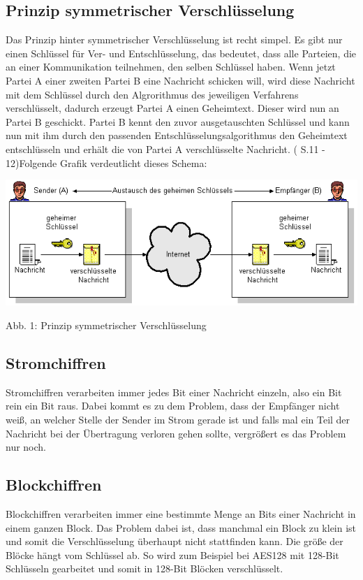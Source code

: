 \documentclass[a4paper,12pt,titlepage]{article}
\begin{document}
\subsection{Prinzip symmetrischer Verschlüsselung}
Das Prinzip hinter symmetrischer Verschlüsselung ist recht simpel. Es gibt nur einen Schlüssel für Ver- und Entschlüsselung, das bedeutet, dass alle Parteien, die an einer Kommunikation teilnehmen, den selben Schlüssel haben. Wenn jetzt Partei A einer zweiten Partei B eine Nachricht schicken will, wird diese Nachricht mit dem Schlüssel durch den Algrorithmus des jeweiligen Verfahrens verschlüsselt, dadurch erzeugt Partei A einen Geheimtext. Dieser wird nun an Partei B geschickt. Partei B kennt den zuvor ausgetauschten Schlüssel und kann nun mit ihm durch den passenden Entschlüsselungsalgorithmus den Geheimtext entschlüsseln und erhält die von Partei A verschlüsselte Nachricht. (\cite{delfs_knebl} S.11 - 12)\newline Folgende Grafik verdeutlicht dieses Schema:
\begin{center}
\includegraphics[scale=0.7,natwidth=629,natheight=225]{symm_shema.png} %
\end{center}
Abb. 1: Prinzip symmetrischer Verschlüsselung

\subsection{Stromchiffren}
Stromchiffren verarbeiten immer jedes Bit einer Nachricht einzeln, also ein Bit rein ein Bit raus. Dabei kommt es zu dem Problem, dass der Empfänger nicht weiß, an welcher Stelle der Sender im Strom gerade ist und falls mal ein Teil der Nachricht bei der Übertragung verloren gehen sollte, vergrößert es das Problem nur noch.

\subsection{Blockchiffren}
Blockchiffren verarbeiten immer eine bestimmte Menge an Bits einer Nachricht in einem ganzen Block. Das Problem dabei ist, dass manchmal ein Block zu klein ist und somit die Verschlüsselung überhaupt nicht stattfinden kann. Die größe der Blöcke hängt vom Schlüssel ab. So wird zum Beispiel bei AES128 mit 128-Bit Schlüsseln gearbeitet und somit in 128-Bit Blöcken verschlüsselt.
\end{document}
